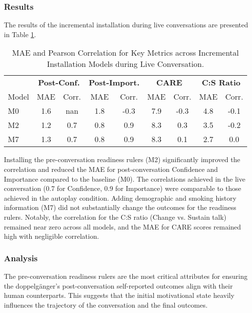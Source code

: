 \subsubsection{Results}

The results of the incremental installation during live conversations are presented in Table \ref{tab:incremental_installation}.

\begin{table}[h]
\centering
\caption{MAE and Pearson Correlation for Key Metrics across Incremental Installation Models during Live Conversation.}
\label{tab:incremental_installation}
\begin{tabular}{|l|cc|cc|cc|cc|}
\hline
 & \multicolumn{2}{c|}{\textbf{Post-Conf.}} & \multicolumn{2}{c|}{\textbf{Post-Import.}} & \multicolumn{2}{c|}{\textbf{CARE}} & \multicolumn{2}{c|}{\textbf{C:S Ratio}} \\
Model & MAE & Corr. & MAE & Corr. & MAE & Corr. & MAE & Corr. \\ \hline
M0 & 1.6 & nan & 1.8 & -0.3 & 7.9 & -0.3 & 4.8 & -0.1 \\
M2 & 1.2 & 0.7 & 0.8 & 0.9 & 8.3 & 0.3 & 3.5 & -0.2 \\
M7 & 1.3 & 0.7 & 0.8 & 0.9 & 8.3 & 0.1 & 2.7 & 0.0 \\ \hline
\end{tabular}
\end{table}

Installing the pre-conversation readiness rulers (M2) significantly improved the correlation and reduced the MAE for post-conversation Confidence and Importance compared to the baseline (M0). The correlations achieved in the live conversation (0.7 for Confidence, 0.9 for Importance) were comparable to those achieved in the autoplay condition. Adding demographic and smoking history information (M7) did not substantially change the outcomes for the readiness rulers. Notably, the correlation for the C:S ratio (Change vs. Sustain talk) remained near zero across all models, and the MAE for CARE scores remained high with negligible correlation.

\subsubsection{Analysis}

The pre-conversation readiness rulers are the most critical attributes for ensuring the doppelgänger's post-conversation self-reported outcomes align with their human counterparts. This suggests that the initial motivational state heavily influences the trajectory of the conversation and the final outcomes.

